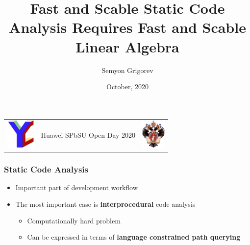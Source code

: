 \documentclass[xcolor=table]{beamer}
\title[Static code analysis and linear algebra]{Fast and Scable Static Code Analysis Requires Fast and Scable Linear Algebra}
\institute[SPbSU]{
St Petersburg University
}
\author[Semyon Grigorev]{Semyon Grigorev}
\date{October, 2020}
\begin{document}
{
\begin{frame}[fragile]
  \begin{table}
  \centering
  \begin{tabularx}{\linewidth}{XcX}
    \includegraphics[height=1.5cm]{pictures/YC_logo.pdf} \hfill
    & \begin{minipage}[t]{0.3\textwidth}\center \vspace{-1cm}  Huawei-SPbSU Open Day 2020
      \end{minipage}
    & \hfill \includegraphics[height=1.5cm]{pictures/SPbGU_Logo.png}
  \end{tabularx}
  \end{table}
  \titlepage
\end{frame}
}


\begin{frame}[fragile]
  \frametitle{Static Code Analysis}
  \begin{itemize}
  \item Important part of development workflow
  \item The most important case is \textbf{interprocedural} code analysis
  \pause
  \begin{itemize}
    \item Computationally hard problem
    \item Can be expressed in terms of \textbf{language constrained path querying} 
  \end{itemize}
  \end{itemize}
\end{frame}
\end{document}
